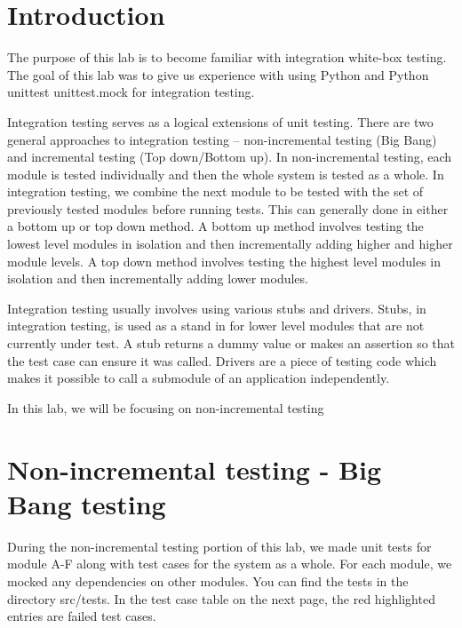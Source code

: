 \documentclass[12pt, letterpaper, titlepage]{article}
\begin{document}
 
\singlespacing

\section{Introduction}
The purpose of this lab is to become familiar with integration white-box testing. The goal of this lab was to give us experience with using Python and Python unittest unittest.mock for integration testing.

Integration testing serves as a logical extensions of unit testing. There are two general approaches to integration testing -- non-incremental testing (Big Bang) and incremental testing (Top down/Bottom up). In non-incremental testing, each module is tested individually and then the whole system is tested as a whole. In integration testing, we combine the next module to be tested with the set of previously tested modules before running tests. This can generally done in either a bottom up or top down method. A bottom up method involves testing the lowest level modules in isolation and then incrementally adding higher and higher module levels. A top down method involves testing the highest level modules in isolation and then incrementally adding lower modules.

Integration testing usually involves using various stubs and drivers. Stubs, in integration testing, is used as a stand in for lower level modules that are not currently under test. A stub returns a dummy value or makes an assertion so that the test case can ensure it was called. Drivers are a piece of testing code which makes it possible to call a submodule of an application independently.

In this lab, we will be focusing on non-incremental testing

\section{Non-incremental testing - Big Bang testing}
During the non-incremental testing portion of this lab, we made unit tests for module A-F along with test cases for the system as a whole. For each module, we mocked any dependencies on other modules. You can find the tests in the directory src/tests. In the test case table on the next page, the red highlighted entries are failed test cases.
\end{document}
